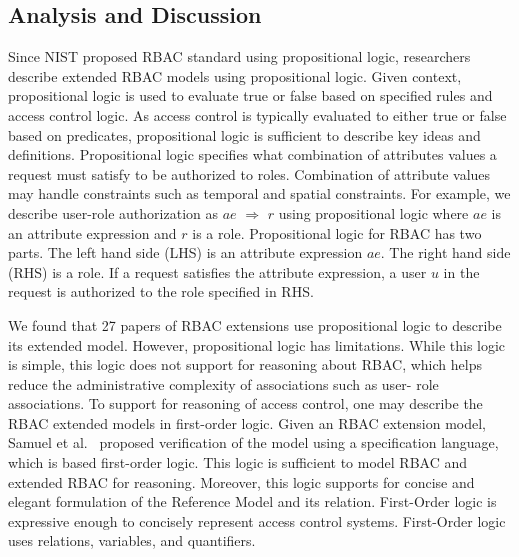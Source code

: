 \subsection{Analysis and Discussion}

Since NIST proposed RBAC standard using propositional logic, researchers describe extended RBAC models using propositional logic. Given context, propositional logic is used to evaluate true or false based on specified rules and access control logic. As access control is typically evaluated to either true or false based on predicates, propositional logic is sufficient to describe key ideas and definitions. Propositional logic specifies what combination of attributes values a request must satisfy to be authorized to roles. 
Combination of attribute values may handle constraints such as temporal and spatial constraints. For example, we describe user-role authorization as $ae$ $\Rightarrow$ $r$ using propositional logic where $ae$ is an attribute expression and $r$ is a role. Propositional logic for RBAC has two parts. The left hand side (LHS) is an attribute expression $ae$. 
The right hand side (RHS) is a role. 
If a request satisfies the attribute expression, a user $u$ in the request is authorized to the role specified in RHS.

We found that 27 papers of RBAC extensions use propositional logic to describe its extended model.
However, propositional logic has limitations. While this logic is simple, this logic does not support for reasoning about RBAC, which helps
reduce the administrative complexity of associations such as user- role associations.
To support for reasoning of access control, one may describe the RBAC extended models in first-order logic. 
Given an RBAC extension model, Samuel et al.~\cite{samuel07:spatio-temporal} proposed verification of the model using a specification language, which is based first-order logic. 
This logic is sufficient to model RBAC and extended RBAC for reasoning. 
Moreover, this logic supports for concise and elegant formulation of the Reference Model and its relation. 
First-Order logic is expressive enough to concisely represent access control systems. First-Order logic uses relations, variables, and quantifiers.
